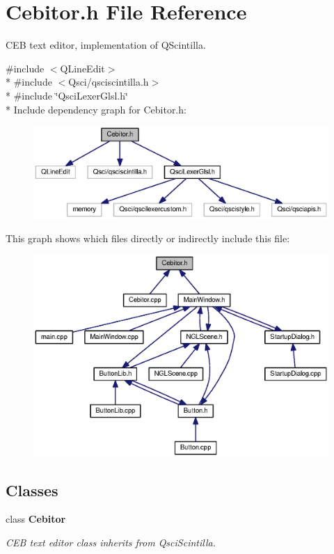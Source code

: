 \section{Cebitor.\-h File Reference}
\label{_cebitor_8h}


C\-E\-B text editor, implementation of Q\-Scintilla.  


{\ttfamily \#include $<$Q\-Line\-Edit$>$}\\*
{\ttfamily \#include $<$Qsci/qsciscintilla.\-h$>$}\\*
{\ttfamily \#include \char`\"{}Qsci\-Lexer\-Glsl.\-h\char`\"{}}\\*
Include dependency graph for Cebitor.\-h\-:\nopagebreak
\begin{figure}[H]
\begin{center}
\leavevmode
\includegraphics[width=350pt]{_cebitor_8h__incl}
\end{center}
\end{figure}
This graph shows which files directly or indirectly include this file\-:\nopagebreak
\begin{figure}[H]
\begin{center}
\leavevmode
\includegraphics[width=350pt]{_cebitor_8h__dep__incl}
\end{center}
\end{figure}
\subsection*{Classes}
\begin{DoxyCompactItemize}
\item 
class {\bf Cebitor}
\begin{DoxyCompactList}\small\item\em C\-E\-B text editor class inherits from Qsci\-Scintilla. \end{DoxyCompactList}\end{DoxyCompactItemize}


